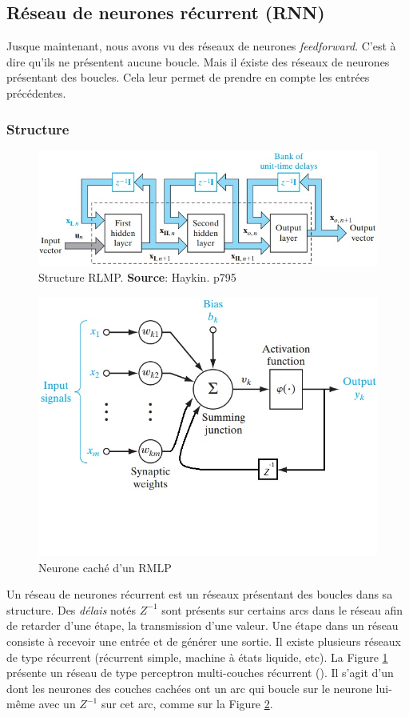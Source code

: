 \subsection{Réseau de neurones récurrent (RNN)}
Jusque maintenant, nous avons vu des réseaux de neurones \emph{feedforward}.
C'est à dire qu'ils ne présentent aucune boucle. Mais il éxiste des réseaux de neurones présentant des boucles.
Cela leur permet de prendre en compte les entrées précédentes.
\subsubsection*{Structure}
\begin{figure}
 \centering
 \includegraphics[scale=0.5]{../figures/structurermlp.jpg}
 \caption{Structure RLMP. \textbf{Source}: Haykin. p795\cite{Haykin}}
 \label{structurermlp}
\end{figure}
\begin{figure}
 \centering
 \includegraphics[scale=0.5]{../figures/neuronermlp.jpg}
 \caption{Neurone caché d'un RMLP}
 \label{neuronermlp}
\end{figure}
Un réseau de neurones récurrent est un réseaux présentant des boucles dans sa structure.
Des \emph{délais} notés $Z^{-1}$ sont présents sur certains arcs dans le réseau afin de retarder d'une étape, la transmission d'une valeur.
Une étape dans un réseau consiste à recevoir une entrée et de générer une sortie.
Il existe plusieurs réseaux de type récurrent (récurrent simple, machine à états liquide, etc).
La Figure \ref{structurermlp} présente un réseau de type perceptron multi-couches récurrent (\rmlp).
Il s'agit d'un \mlp dont les neurones des couches cachées ont un arc qui boucle sur le neurone lui-même avec un $Z^{-1}$ sur cet arc, comme sur la Figure \ref{neuronermlp}.
